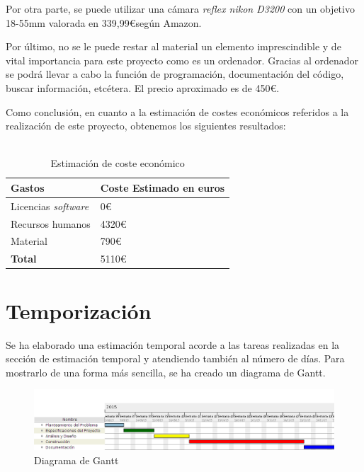 Por otra parte, se puede utilizar una cámara \textit{reflex nikon D3200} con un objetivo 18-55mm valorada en 339,99\euro según Amazon.\cite{NikonAmazon}

Por último, no se le puede restar al material un elemento imprescindible y de vital importancia para este proyecto como es un ordenador. Gracias al ordenador se podrá llevar a cabo la función de programación, documentación del código, buscar información, etcétera. El precio aproximado es de 450\euro.

Como conclusión, en cuanto a la estimación de costes económicos referidos a la realización de este proyecto, obtenemos los siguientes resultados:
\\ \\
\begin{table}[h]
\centering
\label{table:costeEstimado}
\begin{tabular}{ll}
\hline
{\bf Gastos}                   & {\bf Coste Estimado en euros} \\ \hline
Licencias \textit{software}   & 0\euro                             \\
Recursos humanos              & 4320\euro                          \\
Material                      & 790\euro                           \\
{\bf Total}                   & 5110\euro                          \\ \hline
\end{tabular}
\caption{Estimación de coste económico}
\end{table}


\section{Temporización}
Se ha elaborado una estimación temporal acorde a las tareas realizadas en la sección de estimación temporal y atendiendo también al número de días. Para mostrarlo de una forma más sencilla, se ha creado un diagrama de Gantt.

\begin{figure}[htb]
\centering
\includegraphics[width=1\textwidth]{./imagenes/proyectoGantt}
\caption{Diagrama de Gantt} \label{fig:proyectoGantt}
\end{figure}
